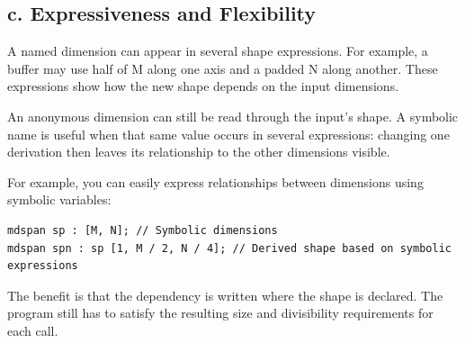 \subsection*{\textbf{c. Expressiveness and Flexibility}}

A named dimension can appear in several shape expressions. For example, a buffer may use half of M along one axis and a padded N along another. These expressions show how the new shape depends on the input dimensions.

An anonymous dimension can still be read through the input's shape. A symbolic name is useful when that same value occurs in several expressions: changing one derivation then leaves its relationship to the other dimensions visible.

For example, you can easily express relationships between dimensions using symbolic variables:

\begin{lstlisting}[language=croqtile,caption={c. Expressiveness and Flexibility}]
mdspan sp : [M, N]; // Symbolic dimensions
mdspan spn : sp [1, M / 2, N / 4]; // Derived shape based on symbolic expressions
\end{lstlisting}

The benefit is that the dependency is written where the shape is declared. The program still has to satisfy the resulting size and divisibility requirements for each call.

